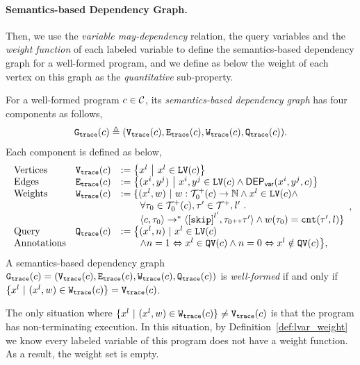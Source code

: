 \paragraph{Semantics-based Dependency Graph.}
Then, we use the \emph{variable may-dependency} relation, the query variables and the \emph{weight function}
of each labeled variable to 
define the semantics-based dependency graph for a well-formed program,
and we define as below the
weight of each vertex on this graph as the \emph{quantitative} sub-property.
\begin{defn}
\label{def:trace_graph}
For a well-formed program ${c} \in \mathcal{C}$,
its \emph{semantics-based dependency graph} has four components as follows,
\[
 \mathtt{{G_{trace}}}({c}) \triangleq (\mathtt{{V_{trace}}}({c}), \mathtt{{E_{trace}}}({c}), \mathtt{{W_{trace}}}({c}), \mathtt{{Q_{trace}}}({c})).
\]
Each component is defined as below,
{\small
\[
\begin{array}{lll}
 \text{Vertices} &
 \traceV({c}) & := \left\{ 
 x^l
 ~ \middle\vert ~ x^l \in \lvar(c)
 \right\}
 \\
 \text{Edges} &
 \traceE({c}) & := 
 \left\{ 
 (x^i, y^j) 
 ~ \middle\vert ~
 x^i, y^j \in \lvar(c) \land \vardep(x^i, y^j, c) 
 \right\}
 \\
 \text{Weights} &
 \traceW({c}) & := 
 \{ 
 (x^l, w) 
 ~ \vert ~ 
 w : \ftdom_0(c) \to \mathbb{N}
 \land
 x^l \in \lvar(c) \land
 \\ & & \qquad 
 \forall \trace_0 \in \ftdom_0(c), \trace' \in \ftdom, l' \sthat 
 \\ & & \qquad 
 \config{{c}, \trace_0} \to^{*} 
 \config{\clabel{\eskip}^{l'}, \trace_0 \tracecat \trace'} 
 \land w(\trace_0) = \vcounter(\trace', l) \} 
 \\
 \text{Query} &
 \traceF({c}) & := 
 \big\{(x^l, n) 
 ~ \vert ~ x^l \in \lvar(c) 
 \\ \text{Annotations} & & \qquad
 \land n = 1 \Leftrightarrow x^l \in \qvar(c) \land n = 0 \Leftrightarrow x^l \notin \qvar(c)
 \big\},
\end{array},
\]
}
A semantics-based dependency graph $\mathtt{{G_{trace}}}({c})= (\mathtt{{V_{trace}}}({c}), \mathtt{{E_{trace}}}({c}), \mathtt{{W_{trace}}}({c}), \mathtt{{Q_{trace}}}({c}))$ 
is \emph{well-formed} if and only if $ \{x^l \ |\ (x^l,w)\in \mathtt{{W_{trace}}}({c})\} = \mathtt{{V_{trace}}}({c}) $.
\end{defn}
The only situation where $ \{x^l \ |\ (x^l,w)\in \traceW({c})\} \neq \traceV({c}) $ is that the program
has non-terminating execution.
In this situation, by Definition~\ref{def:lvar_weight}  we know every labeled variable of this program does not have a weight function.
As a result, the weight set is empty.

